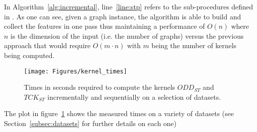 In Algorithm~\ref{alg:incremental}, line~\ref{line:stp} refers to the sub-procedures
defined in \cite{nnavarin, rtesselli}.
As one can see, given a graph instance, the algorithm is able to build and
collect the features in one pass thus maintaining a performance of $O(n)$ where
$n$ is the dimension of the input (i.e. the number of graphs) versus the
previous approach that would require $O(m \cdot n)$ with $m$ being the number of
kernels being computed.

\begin{figure}[ht]
    \centering
    \texttt{[image: Figures/kernel\_times]}
    \caption{Times in seconds required to compute the kernels $ODD_{ST}$ and 
    $TCK_{ST}$ incrementally and sequentially on a selection of datasets.}
    \label{fig:times}
\end{figure}

The plot in figure~\ref{fig:times} shows the measured times on a variety of
datasets (see Section~\ref{subsec:datasets} for further details on each one)



